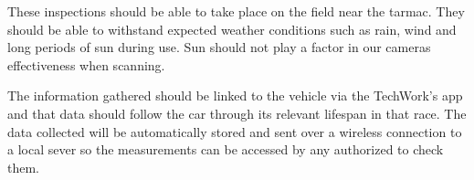 \documentclass[draftclsnofoot,onecolumn,letterpaper,10pt,compsoc]{IEEEtran}
\begin{document}
\noindent These inspections should be able to take place on the field near the tarmac. They should be able to withstand expected weather conditions such as rain, wind and long periods of sun during use. Sun should not play a factor in our cameras effectiveness when scanning.  


\noindent The information gathered should be linked to the vehicle via the TechWork’s app and that data should follow the car through its relevant lifespan in that race. The data collected will be automatically stored and sent over a wireless connection to a local sever so the measurements can be accessed by any authorized to check them.
\clearpage

 
 
\end{document}
